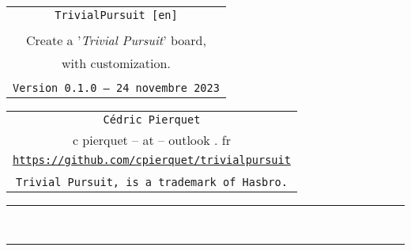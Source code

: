 \documentclass[11pt,a4paper]{ltxdoc}
\def\TPversion{0.1.0}
\def\TPdate{24 novembre 2023}
\begin{document}
\pagestyle{fancy}

\thispagestyle{empty}

\begin{center}
	\begin{minipage}{0.88\linewidth}
	\begin{tcolorbox}[colframe=yellow,colback=yellow!15]
		\begin{center}
			\begin{tabular}{c}
				{\Huge \texttt{TrivialPursuit [en]}}\\
				\\
				{\LARGE Create a '\textit{Trivial Pursuit}' board,} \\
				{\LARGE with customization.} \\
				\\
				{\small \texttt{Version \TPversion{} -- \TPdate}}
		\end{tabular}
		\end{center}
	\end{tcolorbox}
\end{minipage}
\end{center}

\begin{center}
	\begin{tabular}{c}
	\texttt{Cédric Pierquet}\\
	{\ttfamily c pierquet -- at -- outlook . fr}\\
	\texttt{\url{https://github.com/cpierquet/trivialpursuit}} \\
	\\
	\texttt{Trivial Pursuit\texttrademark, is a trademark of Hasbro.}
\end{tabular}
\end{center}

\hrule

\vfill

\begin{tcolorbox}[colframe=lightgray,colback=lightgray!5]
\BoardTrivialPursuit
\end{tcolorbox}

\vfill~

\pagebreak


\hypertarget{matoc}{}

\tableofcontents

\vspace*{5mm}

\hrule

\vspace*{5mm}
\end{document}
